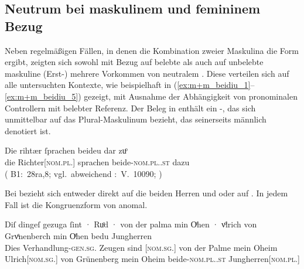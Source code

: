 
\subsection{Neutrum bei maskulinem und femininem Bezug}
\label{subsec:m+m_anim_beidiu}

Neben regelmäßigen Fällen, in denen die Kombination zweier Maskulina die Form
 ergibt, zeigten sich sowohl mit Bezug auf belebte als
auch auf unbelebte maskuline
(Erst-) mehrere Vorkommen von neutralem
. Diese verteilen sich auf alle untersuchten Kontexte, wie
beispielhaft in (\ref{ex:m+m_beidiu_1}--\ref{ex:m+m_beidiu_5}) gezeigt, mit
Ausnahme der Abhängigkeit von pronominalen Controllern mit
belebter Referenz. Der Beleg in  enthält ein
-, das sich unmittelbar auf das Plural-Maskulinum
  bezieht, das seinerseits männlich
denotiert ist.

\begin{exe}
\ex \label{ex:m+m_beidiu_1}
	\gll Die rihtær ſprachen beideu {dar zuͦ} \\
		die Richter[\textsc{nom.pl.\MascM}] sprachen
		beide-\textsc{nom.pl.\NeutM.st} dazu \\
	\trans {}
		(%
			B1:~28ra,8; vgl.~abweichend
			\KC:~V.~10090;
			\cite[267]{schroeder1895}%
		)
\end{exe}

Bei  bezieht sich  entweder direkt auf die
beiden Herren  und 
oder auf  . In jedem Fall ist die Kongruenzform von
 anomal.

\begin{exe}
\ex \label{ex:m+m_beidiu_3}
	\gll Diſ dingeſ gezuga ſint · Ruͦd · von der palma min Oͤhen · vͦlrich
			von Grvͤnenberch min Oͤhen bedu Jungherren \textelp{} \\
		Dies Verhandlung-\textsc{gen.sg.\NeutI} Zeugen sind {}
			[\textsc{nom.sg.\MascM}] {} von der Palme mein Oheim
			{} Ulrich[\textsc{nom.sg.\MascM}] von Grünenberg mein Oheim
			beide-\textsc{nom.pl.\NeutM.st}
			Jungherren[\textsc{nom.pl.\MascM}] {} \\
	\trans {}
		\parencites(Nr.~2915, Kl.~St.~Urban, Kt.~Luzern, 1298)[213,33--35]{cao4}
\end{exe}

